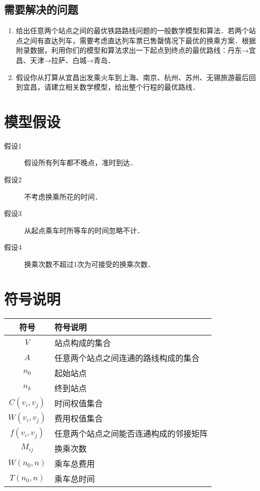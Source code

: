 \documentclass[UTF8]{ctexart}
\begin{document}
\subsection{需要解决的问题}
\begin{enumerate}
  \item 给出任意两个站点之间的最优铁路路线问题的一般数学模型和算法．若两个站点之间有直达列车，需要考虑直达列车票已售罄情况下最优的换乘方案．根据附录数据，利用你们的模型和算法求出一下起点到终点的最优路线：丹东→宜昌、天津→拉萨、白城→青岛．
  \item 假设你从打算从宜昌出发乘火车到上海、南京、杭州、苏州、无锡旅游最后回到宜昌，请建立相关数学模型，给出整个行程的最优路线．
\end{enumerate}

\section{模型假设}
\begin{description}
  \item[假设1] 假设所有列车都不晚点，准时到达．
  \item[假设2] 不考虑换乘所花的时间．
  \item[假设3] 从起点乘车时所等车的时间忽略不计．
  \item[假设4] 换乘次数不超过1次为可接受的换乘次数．
\end{description}

\section{符号说明}
\begin{table}[h]
  \centering
  \begin{tabular}{cl}
     \toprule
     符号 & 符号说明 \\
     \midrule
     $V$ & 站点构成的集合 \\
     $A$ & 任意两个站点之间连通的路线构成的集合 \\
     $n_0$ & 起始站点 \\
     $n_k$ & 终到站点 \\
     $C(v_i,v_j)$ & 时间权值集合 \\
     $W(v_i,v_j)$ & 费用权值集合 \\
     $f(v_i,v_j)$ & 任意两个站点之间能否连通构成的邻接矩阵 \\
     $M_{ij}$ & 换乘次数 \\
     $W(n_0,n)$ & 乘车总费用 \\
     $T(n_0,n)$ & 乘车总时间 \\
     \bottomrule
   \end{tabular}
\end{table}
\end{document}
